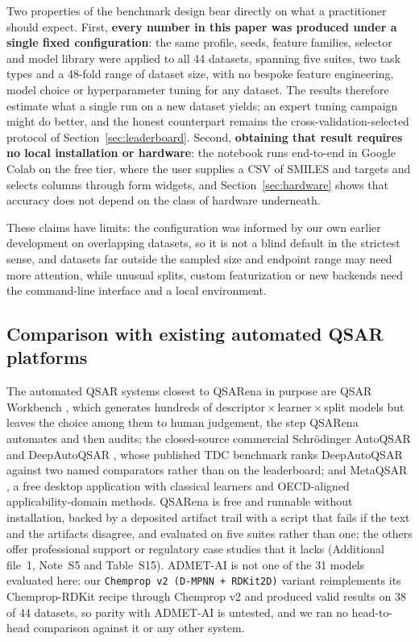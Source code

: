 Two properties of the benchmark design bear directly on what a practitioner should expect. First, \textbf{every number in this paper was produced under a single fixed configuration}: the same profile, seeds, feature families, selector and model library were applied to all 44 datasets, spanning five suites, two task types and a 48-fold range of dataset size, with no bespoke feature engineering, model choice or hyperparameter tuning for any dataset. The results therefore estimate what a single run on a new dataset yields; an expert tuning campaign might do better, and the honest counterpart remains the cross-validation-selected protocol of Section~\ref{sec:leaderboard}. Second, \textbf{obtaining that result requires no local installation or hardware}: the notebook runs end-to-end in Google Colab on the free tier, where the user supplies a CSV of SMILES and targets and selects columns through form widgets, and Section~\ref{sec:hardware} shows that accuracy does not depend on the class of hardware underneath.

These claims have limits: the configuration was informed by our own earlier development on overlapping datasets, so it is not a blind default in the strictest sense, and datasets far outside the sampled size and endpoint range may need more attention, while unusual splits, custom featurization or new backends need the command-line interface and a local environment.

\subsection{Comparison with existing automated QSAR platforms}\label{sec:platforms}

The automated QSAR systems closest to QSARena in purpose are QSAR Workbench \cite{cox2013qsarworkbench}, which generates hundreds of descriptor\,$\times$\,learner\,$\times$\,split models but leaves the choice among them to human judgement, the step QSARena automates and then audits; the closed-source commercial Schr\"odinger AutoQSAR and DeepAutoQSAR \cite{dixon2016autoqsar,schrodinger2024deepautoqsar}, whose published TDC benchmark ranks DeepAutoQSAR against two named comparators rather than on the leaderboard; and MetaQSAR \cite{ambure2026metaqsar}, a free desktop application with classical learners and OECD-aligned applicability-domain methods. QSARena is free and runnable without installation, backed by a deposited artifact trail with a script that fails if the text and the artifacts disagree, and evaluated on five suites rather than one; the others offer professional support or regulatory case studies that it lacks (Additional file~1, Note~S5 and Table~S15). ADMET-AI \cite{swanson2024admetai} is not one of the 31 models evaluated here: our \texttt{Chemprop v2 (D-MPNN + RDKit2D)} variant reimplements its Chemprop-RDKit recipe through Chemprop v2 and produced valid results on 38 of 44 datasets, so parity with ADMET-AI is untested, and we ran no head-to-head comparison against it or any other system.

